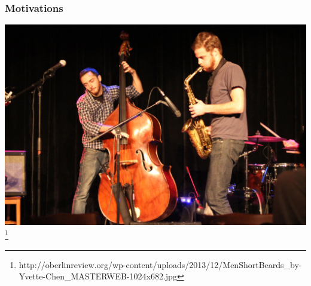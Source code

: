 \documentclass[mathserif,serif]{beamer}
\begin{document}
\begin{frame}
	\frametitle{Motivations}

	\includegraphics[width=\textwidth]{mwsb-jazz}
        \footnote{http://oberlinreview.org/wp-content/uploads/2013/12/MenShortBeards\_by-Yvette-Chen\_MASTERWEB-1024x682.jpg}
\end{frame}


\end{document}
